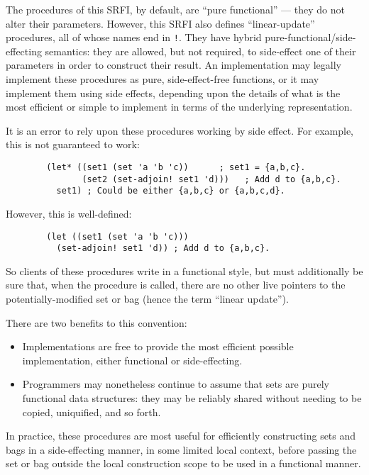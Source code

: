 The procedures of this SRFI, by default, are ``pure functional'' ---
they do not alter their parameters. However, this SRFI also defines
``linear-update'' procedures, all of whose names end in \texttt{!}. They
have hybrid pure-functional/side-effecting semantics: they are allowed,
but not required, to side-effect one of their parameters in order to
construct their result. An implementation may legally implement these
procedures as pure, side-effect-free functions, or it may implement them
using side effects, depending upon the details of what is the most
efficient or simple to implement in terms of the underlying
representation.

It is an error to rely upon these procedures working by side effect. For
example, this is not guaranteed to work:

\begin{verbatim}
        (let* ((set1 (set 'a 'b 'c))      ; set1 = {a,b,c}.
               (set2 (set-adjoin! set1 'd)))   ; Add d to {a,b,c}.
          set1) ; Could be either {a,b,c} or {a,b,c,d}.
\end{verbatim}

However, this is well-defined:

\begin{verbatim}
        (let ((set1 (set 'a 'b 'c)))
          (set-adjoin! set1 'd)) ; Add d to {a,b,c}.
\end{verbatim}

So clients of these procedures write in a functional style, but must
additionally be sure that, when the procedure is called, there are no
other live pointers to the potentially-modified set or bag (hence the
term ``linear update'').

There are two benefits to this convention:

\begin{itemize}
\item
  Implementations are free to provide the most efficient possible
  implementation, either functional or side-effecting.
\item
  Programmers may nonetheless continue to assume that sets are purely
  functional data structures: they may be reliably shared without
  needing to be copied, uniquified, and so forth.
\end{itemize}

In practice, these procedures are most useful for efficiently
constructing sets and bags in a side-effecting manner, in some limited
local context, before passing the set or bag outside the local
construction scope to be used in a functional manner.

